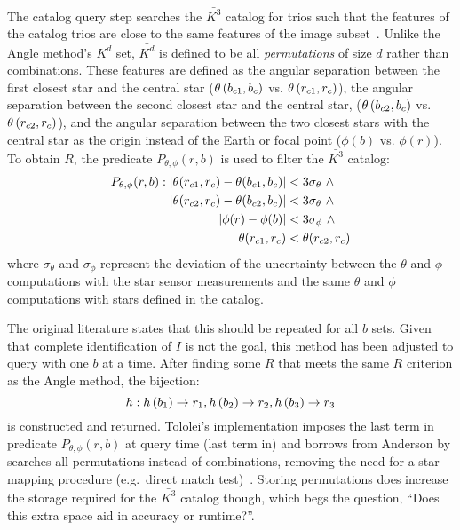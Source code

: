 The catalog query step searches the $\bar{K^3}$ catalog for trios such that the features of the catalog trios are
close to the same features of the image subset~\cite{bratt:analysisStarIdentification}.
Unlike the Angle method's $K^d$ set, $\bar{K^d}$ is defined to be all \textit{permutations} of size $d$ rather than
combinations.
These features are defined as the angular separation between the first closest star and the central star
($\theta\left(b_{c1}, b_c\right)$ vs. $ \theta\left(r_{c1}, r_c\right)$), the
angular separation between the second closest star and the central star, ($\theta\left(b_{c2},
b_c\right) $ vs. $\theta\left(r_{c2}, r_c\right)$),
and the angular separation between the two closest stars with the central star as the origin instead of the Earth or 
focal point ($\phi(b) $ vs. $ \phi(r)$).
To obtain $R$, the predicate $P_{\theta, \phi}(r, b)$ is used to filter the $\bar{K^3}$ catalog:
\begin{equation}
    \begin{aligned}
        P_{\theta, \phi} (r, b): \left\lvert \theta(r_{c1}, r_c) - \theta(b_{c1}, b_c)\right\rvert
        &< 3 \sigma_{\theta} \ \land \\ \left\lvert \theta(r_{c2}, r_c) - \theta(b_{c2}, 
        b_c)\right\rvert &< 3 \sigma_{\theta} \ \land \\ \left\lvert \phi(r) - \phi(b)\right\rvert &< 3 
        \sigma_\phi \ \land \\\theta(r_{c1}, r_c) &< \theta(r_{c2}, r_c)
    \end{aligned}
\end{equation}
where $\sigma_{\theta}$ and $\sigma_{\phi}$ represent the deviation of the uncertainty between the $\theta$ and $\phi$
computations with the star sensor measurements and the same $\theta$ and $\phi$ computations with stars defined in the
catalog.

The original literature states that this should be repeated for all $b$ sets.
Given that complete identification of $I$ is not the goal, this method has been adjusted to query with one $b$ at a
time.
After finding some $R$ that meets the same $R$ criterion as the Angle method, the bijection:
\begin{equation}
    h: h\left(b_1\right) \rightarrow r_1, h\left(b_2\right) \rightarrow r_2, h\left(b_3\right)
    \rightarrow r_3
\end{equation}
is constructed and returned.
Tololei's implementation imposes the last term in predicate $P_{\theta, \phi}(r, b)$ at query time (last term in)
and borrows from Anderson by searches all permutations instead of combinations, removing the need for a star
mapping procedure (e.g.\ direct match test)~\cite{toloei:compositeIdentification, anderson:autonomousStarSensing}.
Storing permutations does increase the storage required for the $\bar{K^3}$ catalog though, which begs the question,
``Does this extra space aid in accuracy or runtime?''.

